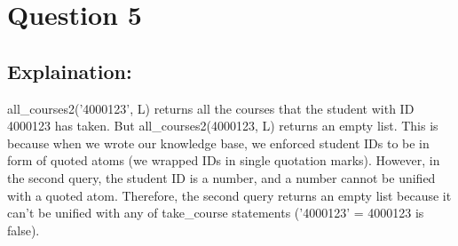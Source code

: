 \section{Question 5}

\subsection{Explaination:}

all_courses2('4000123', L) returns all the courses that the student with ID 4000123 has taken.
But all_courses2(4000123, L) returns an empty list.
This is because when we wrote our knowledge base, we enforced student IDs to be in form of quoted atoms (we wrapped IDs in single quotation marks).
However, in the second query, the student ID is a number, and a number cannot be unified with a
quoted atom.
Therefore, the second query returns an empty list because it can’t be unified with any of
take_course statements ('4000123' = 4000123 is false).
